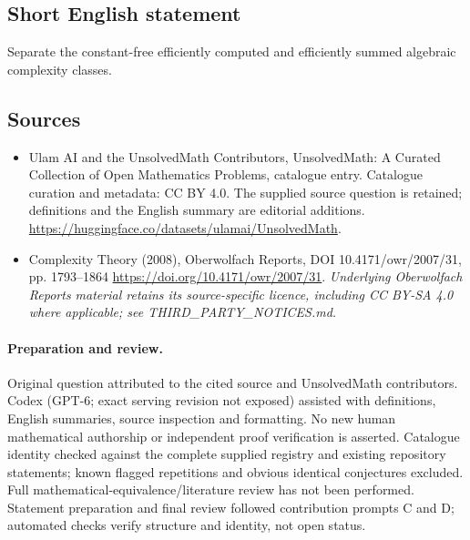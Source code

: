 \documentclass[11pt]{article}
\begin{document}
\subsection{Short English statement}
Separate the constant-free efficiently computed and efficiently summed algebraic complexity classes.
\subsection{Sources}
\begin{itemize}
\item[\hypertarget{source:statement:1}{S1}] Ulam AI and the UnsolvedMath Contributors, UnsolvedMath: A Curated Collection of Open Mathematics Problems, catalogue entry. Catalogue curation and metadata: CC BY 4.0. The supplied source question is retained; definitions and the English summary are editorial additions.
\url{https://huggingface.co/datasets/ulamai/UnsolvedMath}.
\item[\hypertarget{source:statement:2}{S2}] Complexity Theory (2008), Oberwolfach Reports, DOI 10.4171/owr/2007/31, pp. 1793--1864
\url{https://doi.org/10.4171/owr/2007/31}.
\textit{Underlying Oberwolfach Reports material retains its source-specific licence, including CC BY-SA 4.0 where applicable; see THIRD\_PARTY\_NOTICES.md.}
\end{itemize}
\paragraph{Preparation and review.}
Original question attributed to the cited source and UnsolvedMath contributors. Codex (GPT-6; exact serving revision not exposed) assisted with definitions, English summaries, source inspection and formatting. No new human mathematical authorship or independent proof verification is asserted. Catalogue identity checked against the complete supplied registry and existing repository statements; known flagged repetitions and obvious identical conjectures excluded. Full mathematical-equivalence/literature review has not been performed. Statement preparation and final review followed contribution prompts C and D; automated checks verify structure and identity, not open status.
\label{end:statement}
\end{document}
